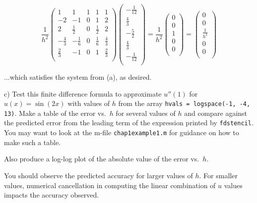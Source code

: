 \begin{solution}
    $$
    \frac{1}{h^2}
    \begin{pmatrix}
        1            &           1  & 1 &           1 & 1 \\
        -2           &           -1 & 0 &           1 & 2 \\
        2            & \frac{1}{2}  & 0 & \frac{1}{2} & 2 \\
        -\frac{4}{3} & -\frac{1}{6} & 0 & \frac{1}{6} & \frac{4}{3} \\
        \frac{2}{3}  &           -1 & 0 & 1           & \frac{2}{3} \\
    \end{pmatrix}
    \begin{pmatrix}
        -\frac{1}{12} \\
        \frac{4}{3} \\
        -\frac{5}{2} \\ 
        \frac{4}{3} \\
        -\frac{1}{12} \\
    \end{pmatrix}
        =
    \frac{1}{h^2}
    \begin{pmatrix}
        0 \\
        0 \\
        1 \\
        0 \\
        0 \\
    \end{pmatrix}
        =
    \begin{pmatrix}
        0 \\
        0 \\
        \frac{1}{h^2} \\
        0 \\
        0 \\
    \end{pmatrix}
    $$

    ...which satisfies the system from (a), as desired.

\end{solution}
\pagebreak

c)  Test this finite difference formula to approximate $u''(1)$ for $u(x) = \sin(2x)$ with values of $h$ from the array 
  \texttt{hvals = logspace(-1, -4, 13)}. Make a table of the error vs.\ $h$ for several values of $h$ and compare 
  against the predicted error from the leading term of the expression printed by \texttt{fdstencil}. You may want to 
  look at the m-file \texttt{chap1example1.m} for guidance on how to make such a table.

  Also produce a log-log plot of the absolute value of the error vs.~$h$.  

  You should observe the predicted accuracy for larger values of $h$. For smaller values, numerical cancellation in 
  computing the linear combination of $u$ values impacts the accuracy observed.
    
\begin{solution}\ \\\\
\end{solution}